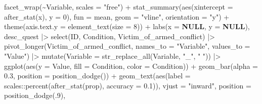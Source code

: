 \documentclass[
  bookmarksnumbered]{article}
\newenvironment{Shaded}{\begin{snugshade}}{\end{snugshade}}
\newcommand{\AttributeTok}[1]{\textcolor[rgb]{0.80,0.80,0.80}{#1}}
\newcommand{\ConstantTok}[1]{\textcolor[rgb]{0.86,0.64,0.64}{\textbf{#1}}}
\newcommand{\DecValTok}[1]{\textcolor[rgb]{0.86,0.86,0.80}{#1}}
\newcommand{\FloatTok}[1]{\textcolor[rgb]{0.75,0.75,0.82}{#1}}
\newcommand{\FunctionTok}[1]{\textcolor[rgb]{0.94,0.94,0.56}{#1}}
\newcommand{\NormalTok}[1]{\textcolor[rgb]{0.80,0.80,0.80}{#1}}
\newcommand{\SpecialCharTok}[1]{\textcolor[rgb]{0.86,0.64,0.64}{#1}}
\newcommand{\StringTok}[1]{\textcolor[rgb]{0.80,0.58,0.58}{#1}}
\begin{document}
\begin{Shaded}
\begin{Highlighting}[]
                      \FunctionTok{facet\_wrap}\NormalTok{(}\SpecialCharTok{\textasciitilde{}}\NormalTok{Variable, }\AttributeTok{scales =} \StringTok{"free"}\NormalTok{) }\SpecialCharTok{+}
                      \FunctionTok{stat\_summary}\NormalTok{(}\FunctionTok{aes}\NormalTok{(}\AttributeTok{xintercept =} \FunctionTok{after\_stat}\NormalTok{(x), }\AttributeTok{y =} \DecValTok{0}\NormalTok{),}
                                   \AttributeTok{fun =}\NormalTok{ mean, }\AttributeTok{geom =} \StringTok{"vline"}\NormalTok{, }\AttributeTok{orientation =} \StringTok{"y"}\NormalTok{) }\SpecialCharTok{+}
                      \FunctionTok{theme}\NormalTok{(}\AttributeTok{axis.text.y =} \FunctionTok{element\_text}\NormalTok{(}\AttributeTok{size =} \DecValTok{8}\NormalTok{)) }\SpecialCharTok{+}
                      \FunctionTok{labs}\NormalTok{(}\AttributeTok{x =} \ConstantTok{NULL}\NormalTok{, }\AttributeTok{y =} \ConstantTok{NULL}\NormalTok{),}
\NormalTok{                    desc\_quest }\SpecialCharTok{|\textgreater{}}
                      \FunctionTok{select}\NormalTok{(ID, Condition, Victim\_of\_armed\_conflict) }\SpecialCharTok{|\textgreater{}}
                      \FunctionTok{pivot\_longer}\NormalTok{(Victim\_of\_armed\_conflict,}
                                   \AttributeTok{names\_to =} \StringTok{"Variable"}\NormalTok{,}
                                   \AttributeTok{values\_to =} \StringTok{"Value"}\NormalTok{) }\SpecialCharTok{|\textgreater{}} 
                      \FunctionTok{mutate}\NormalTok{(}\AttributeTok{Variable =} \FunctionTok{str\_replace\_all}\NormalTok{(Variable, }
                                                        \StringTok{"\_"}\NormalTok{, }\StringTok{" "}\NormalTok{)) }\SpecialCharTok{|\textgreater{}}
                      \FunctionTok{ggplot}\NormalTok{(}\FunctionTok{aes}\NormalTok{(}\AttributeTok{y =}\NormalTok{ Value, }\AttributeTok{fill =}\NormalTok{ Condition, }\AttributeTok{color =}\NormalTok{ Condition)) }\SpecialCharTok{+}
                      \FunctionTok{geom\_bar}\NormalTok{(}\AttributeTok{alpha =} \FloatTok{0.3}\NormalTok{, }\AttributeTok{position =} \FunctionTok{position\_dodge}\NormalTok{()) }\SpecialCharTok{+}
                      \FunctionTok{geom\_text}\NormalTok{(}\FunctionTok{aes}\NormalTok{(}\AttributeTok{label =}\NormalTok{ scales}\SpecialCharTok{::}\FunctionTok{percent}\NormalTok{(}\FunctionTok{after\_stat}\NormalTok{(prop), }\AttributeTok{accuracy =} \FloatTok{0.1}\NormalTok{)),}
                                \AttributeTok{vjust =} \StringTok{"inward"}\NormalTok{,}
                                \AttributeTok{position =} \FunctionTok{position\_dodge}\NormalTok{(.}\DecValTok{9}\NormalTok{),}

\end{Highlighting}
\end{Shaded}
\end{document}
